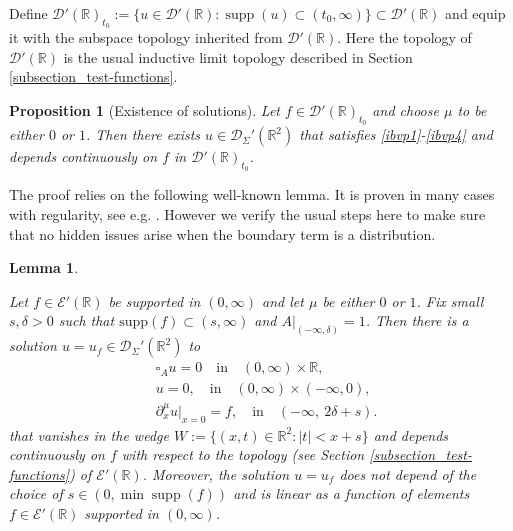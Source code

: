 \documentclass[10pt,a4paper]{article}
\theoremstyle{plain}
\newtheorem{lemma}[theorem]{Lemma}
\newtheorem{proposition}[theorem]{Proposition}
\theoremstyle{definition}
\theoremstyle{remark}
\numberwithin{equation}{section}
\newcommand{\R}{\mathbb{R}}
\newcommand{\supp}{\operatorname{supp}}
\begin{document}
Define $\mathcal{D}'(\R)_{t_0} := \{ u \in \mathcal{D}'(\R) : \supp (u) \subset (t_0, \infty) \} \subset \mathcal{D}'(\R) $ and equip it with the subspace topology inherited from $\mathcal{D}'(\R)$. 
Here the topology of $\mathcal{D}'(\R)$ is the usual inductive limit topology described in Section \ref{subsection_test-functions}. 

\begin{proposition}[Existence of solutions]\label{exist-pro}
Let $f \in \mathcal{D}'(\R)_{t_0}$ 
and choose $\mu$ to be either $0$ or $1$.   Then there exists $u \in \mathcal{D}_{\Sigma}'(\R^2) $ that satisfies \eqref{ibvp1}-\eqref{ibvp4} and depends continuously on $f$ in $\mathcal{D}'(\R)_{t_0}$.
\end{proposition}


The proof relies on the following { well-known lemma. It is proven in many cases with regularity, see e.g. \cite{romanov20_recon_princ_coeff_damped_wave,romanov20_recov_poten_damped_wave_equat}. However we verify the usual steps here to make sure that no hidden issues arise when the boundary term is a distribution.}

\begin{lemma}\label{weaker-exist}

Let $f \in \mathcal{E}' (\R)$ be supported in $(0,\infty)$ and let $\mu$ be either $0$ or $1$. 
Fix small $s,\delta>0$ such that $\text{supp} (f) \subset (s,\infty) $ and $A|_{(-\infty , \delta)} = 1$. 
Then  
there is a solution $u = u_{f} \in \mathcal{D}_{\Sigma}'(\R^2) $ to
\begin{align}
&\square_A u = 0 \quad \text{in} \quad  (0,\infty) \times  \R, \label{ibvp11}  \\
&u = 0 ,  \quad \text{in} \quad  (0,\infty) \times (-\infty,0), \label{ibvp22} \\
&\partial_x^\mu u  \big|_{x  = 0}  = f, \quad \text{in}  \quad (-\infty, \ 2\delta + s) . \label{ibvp44}
\end{align}
that vanishes in the wedge $W := \{ (x,t) \in \R^2 : |t| <x +s\}$ and
depends continuously on $f$  with respect to the topology (see Section \ref{subsection_test-functions}) of $\mathcal{E}'(\R)$.
{ Moreover, the solution $u=u_f$ does not depend of the choice of $s \in (0, \min \supp (f))$ and is linear as a function of elements $f \in \mathcal{E}'(\R)$ supported in $(0,\infty)$.
}  
\end{lemma}
\end{document}
